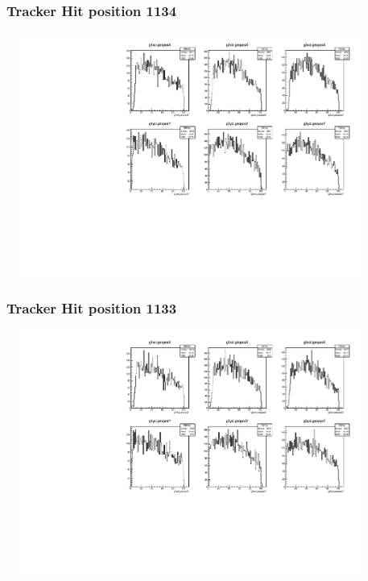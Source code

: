\documentclass[slidestop,compress,mathserif]{beamer}
\begin{document}
\begin{frame}\frametitle{Tracker Hit position 1134}
	 \includegraphics[width=12cm,height=8cm]{Tracker_Hit_position_1134.pdf}
\end{frame}
\begin{frame}\frametitle{Tracker Hit position 1133}
	 \includegraphics[width=12cm,height=8cm]{Tracker_Hit_position_1133.pdf}
\end{frame}
\end{document}
